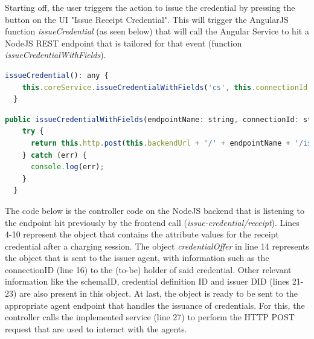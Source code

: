 Starting off, the user triggers the action to issue the credential by pressing the button on the UI "Issue Receipt Credential". This will trigger the AngularJS function \textit{issueCredential} (as seen below) that will call the Angular Service to hit a NodeJS REST endpoint that is tailored for that event (function \textit{issueCredentialWithFields}). 

\begin{lstlisting}[language=JavaScript]
  issueCredential(): any {
    this.coreService.issueCredentialWithFields('cs', this.connectionId, 'receipt', this.eMSPContractID);
  }
\end{lstlisting}

\begin{lstlisting}[language=JavaScript]
  public issueCredentialWithFields(endpointName: string, connectionId: string, credentialEndpoint: string, contractID: string): any {
    try {
      return this.http.post(this.backendUrl + '/' + endpointName + '/issue-credential/' + credentialEndpoint, {"connectionId": connectionId, "eMSPContractID": contractID}, this.headers).toPromise();
    } catch (err) {
      console.log(err);
    }
  }
\end{lstlisting}

The code below is the controller code on the NodeJS backend that is listening to the endpoint hit previously by the frontend call (\textit{issue-credential/receipt}). Lines 4-10 represent the object that contains the attribute values for the receipt credential after a charging session. The object \textit{credentialOffer} in line 14 represents the object that is sent to the issuer agent, with information such as the connectionID (line 16) to the (to-be) holder of said credential. Other relevant information like the schemaID, credential definition ID and issuer DID (lines 21-23) are also present in this object. At last, the object is ready to be sent to the appropriate agent endpoint that handles the issuance of credentials. For this, the controller calls the implemented service (line 27) to perform the HTTP POST request that are used to interact with the agents.

